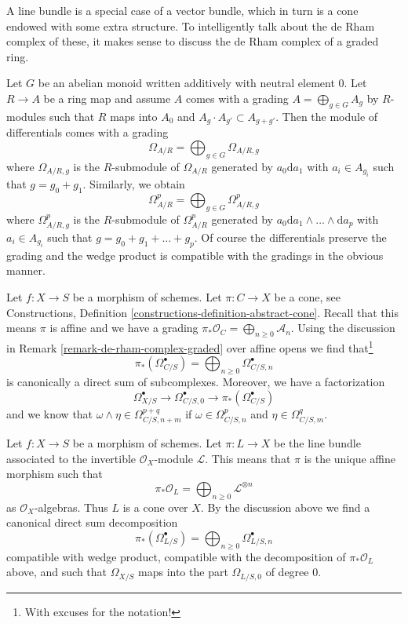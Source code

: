\noindent
A line bundle is a special case of a vector bundle, which in turn is a
cone endowed with some extra structure. To intelligently talk about
the de Rham complex of these, it makes sense to discuss the de Rham
complex of a graded ring.

\begin{remark}
\label{remark-de-rham-complex-graded}
Let $G$ be an abelian monoid written additively with neutral element $0$.
Let $R \to A$ be a ring map and assume $A$ comes with a grading
$A = \bigoplus_{g \in G} A_g$ by $R$-modules such that $R$ maps into $A_0$
and $A_g \cdot A_{g'} \subset A_{g + g'}$. Then the module of differentials
comes with a grading
$$
\Omega_{A/R} = \bigoplus\nolimits_{g \in G} \Omega_{A/R, g}
$$
where $\Omega_{A/R, g}$ is the $R$-submodule of $\Omega_{A/R}$
generated by $a_0 \text{d}a_1$ with $a_i \in A_{g_i}$ such that
$g = g_0 + g_1$. Similarly, we obtain
$$
\Omega^p_{A/R} = \bigoplus\nolimits_{g \in G} \Omega^p_{A/R, g}
$$
where $\Omega^p_{A/R, g}$ is the $R$-submodule of $\Omega^p_{A/R}$
generated by $a_0 \text{d}a_1 \wedge \ldots \wedge \text{d}a_p$
with $a_i \in A_{g_i}$ such that $g = g_0 + g_1 + \ldots + g_p$.
Of course the differentials preserve the grading and the wedge
product is compatible with the gradings in the obvious manner.
\end{remark}

\noindent
Let $f : X \to S$ be a morphism of schemes. Let $\pi : C \to X$ be a cone, see
Constructions, Definition \ref{constructions-definition-abstract-cone}.
Recall that this means $\pi$ is affine and we have a grading
$\pi_*\mathcal{O}_C = \bigoplus_{n \geq 0} \mathcal{A}_n$.
Using the discussion in Remark \ref{remark-de-rham-complex-graded}
over affine opens we find that\footnote{With excuses for the notation!}
$$
\pi_*(\Omega^\bullet_{C/S}) =
\bigoplus\nolimits_{n \geq 0} \Omega^\bullet_{C/S, n}
$$
is canonically a direct sum of subcomplexes. Moreover, we have a factorization
$$
\Omega^\bullet_{X/S} \to \Omega^\bullet_{C/S, 0} \to
\pi_*(\Omega^\bullet_{C/S})
$$
and we know that $\omega \wedge \eta \in \Omega^{p + q}_{C/S, n + m}$
if $\omega \in \Omega^p_{C/S, n}$ and $\eta \in \Omega^q_{C/S, m}$.

\medskip\noindent
Let $f : X \to S$ be a morphism of schemes. Let $\pi : L \to X$ be the
line bundle associated to the invertible $\mathcal{O}_X$-module $\mathcal{L}$.
This means that $\pi$ is the unique affine morphism such that
$$
\pi_*\mathcal{O}_L = 
\bigoplus\nolimits_{n \geq 0} \mathcal{L}^{\otimes n}
$$
as $\mathcal{O}_X$-algebras. Thus $L$ is a cone over $X$.
By the discussion above we find a
canonical direct sum decomposition
$$
\pi_*(\Omega^\bullet_{L/S}) =
\bigoplus\nolimits_{n \geq 0} \Omega^\bullet_{L/S, n}
$$
compatible with wedge product, compatible with the decomposition
of $\pi_*\mathcal{O}_L$ above, and such that $\Omega_{X/S}$
maps into the part $\Omega_{L/S, 0}$ of degree $0$.

